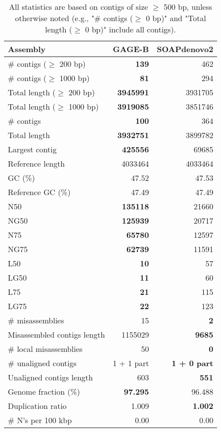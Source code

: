 \documentclass[12pt,a4paper]{article}
\begin{document}
\begin{table}[ht]
\begin{center}
\caption{All statistics are based on contigs of size $\geq$ 500 bp, unless otherwise noted (e.g., "\# contigs ($\geq$ 0 bp)" and "Total length ($\geq$ 0 bp)" include all contigs).}
\begin{tabular}{|l*{2}{|r}|}
\hline
Assembly & GAGE-B & SOAPdenovo2 \\ \hline
\# contigs ($\geq$ 200 bp) & {\bf 139} & 462 \\ \hline
\# contigs ($\geq$ 1000 bp) & {\bf 81} & 294 \\ \hline
Total length ($\geq$ 200 bp) & {\bf 3945991} & 3931705 \\ \hline
Total length ($\geq$ 1000 bp) & {\bf 3919085} & 3851746 \\ \hline
\# contigs & {\bf 100} & 364 \\ \hline
Total length & {\bf 3932751} & 3899782 \\ \hline
Largest contig & {\bf 425556} & 69685 \\ \hline
Reference length & 4033464 & 4033464 \\ \hline
GC (\%) & 47.52 & 47.53 \\ \hline
Reference GC (\%) & 47.49 & 47.49 \\ \hline
N50 & {\bf 135118} & 21660 \\ \hline
NG50 & {\bf 125939} & 20717 \\ \hline
N75 & {\bf 65780} & 12597 \\ \hline
NG75 & {\bf 62739} & 11591 \\ \hline
L50 & {\bf 10} & 57 \\ \hline
LG50 & {\bf 11} & 60 \\ \hline
L75 & {\bf 21} & 115 \\ \hline
LG75 & {\bf 22} & 123 \\ \hline
\# misassemblies & 15 & {\bf 2} \\ \hline
Misassembled contigs length & 1155029 & {\bf 9685} \\ \hline
\# local misassemblies & 50 & {\bf 0} \\ \hline
\# unaligned contigs & 1 + 1 part & {\bf 1 + 0 part} \\ \hline
Unaligned contigs length & 603 & {\bf 551} \\ \hline
Genome fraction (\%) & {\bf 97.295} & 96.488 \\ \hline
Duplication ratio & 1.009 & {\bf 1.002} \\ \hline
\# N's per 100 kbp & 0.00 & 0.00 \\ \hline

\end{tabular}
\end{center}
\end{table}
\end{document}
